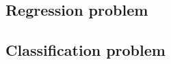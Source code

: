     

\subsection{Regression problem}\label{sec:analysis_regression}





\subsection{Classification problem}\label{sec:analysis_classification}

